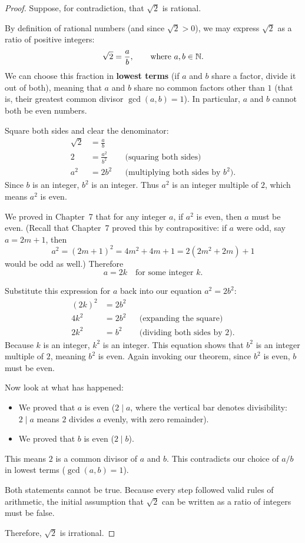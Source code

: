 \begin{proof}
Suppose, for contradiction, that $\sqrt{2}$ is rational. 

By definition of rational numbers (and since $\sqrt{2} > 0$), we may express $\sqrt{2}$ as a ratio of positive integers:
\[
\sqrt{2} = \frac{a}{b}, \qquad \text{where } a, b \in \mathbb{N}.
\]
We can choose this fraction in \textbf{lowest terms} (if $a$ and $b$ share a factor, divide it out of both), meaning that $a$ and $b$ share no common factors other than $1$ (that is, their greatest common divisor $\gcd(a, b) = 1$). In particular, $a$ and $b$ cannot both be even numbers.

Square both sides and clear the denominator:
\begin{align*}
\sqrt{2} &= \frac{a}{b} \\
2 &= \frac{a^2}{b^2} && \text{(squaring both sides)} \\
a^2 &= 2b^2 && \text{(multiplying both sides by } b^2\text{)}.
\end{align*}
Since $b$ is an integer, $b^2$ is an integer. Thus $a^2$ is an integer multiple of $2$, which means $a^2$ is even.

We proved in Chapter~7 that for any integer $a$, if $a^2$ is even, then $a$ must be even. (Recall that Chapter~7 proved this by contrapositive: if $a$ were odd, say $a = 2m+1$, then
\[
a^2 = (2m+1)^2 = 4m^2 + 4m + 1 = 2(2m^2+2m) + 1
\]
would be odd as well.) Therefore
\[
a = 2k \quad \text{for some integer } k.
\]

Substitute this expression for $a$ back into our equation $a^2 = 2b^2$:
\begin{align*}
(2k)^2 &= 2b^2 \\
4k^2 &= 2b^2 && \text{(expanding the square)} \\
2k^2 &= b^2 && \text{(dividing both sides by } 2\text{)}.
\end{align*}
Because $k$ is an integer, $k^2$ is an integer. This equation shows that $b^2$ is an integer multiple of $2$, meaning $b^2$ is even. Again invoking our theorem, since $b^2$ is even, $b$ must be even.

Now look at what has happened:
\begin{itemize}
\item We proved that $a$ is even ($2 \mid a$, where the vertical bar denotes divisibility: $2 \mid a$ means $2$ divides $a$ evenly, with zero remainder).
\item We proved that $b$ is even ($2 \mid b$).
\end{itemize}
This means $2$ is a common divisor of $a$ and $b$. This contradicts our choice of $a/b$ in lowest terms ($\gcd(a, b) = 1$).

Both statements cannot be true. Because every step followed valid rules of arithmetic, the initial assumption that $\sqrt{2}$ can be written as a ratio of integers must be false. 

Therefore, $\sqrt{2}$ is irrational.
\end{proof}

